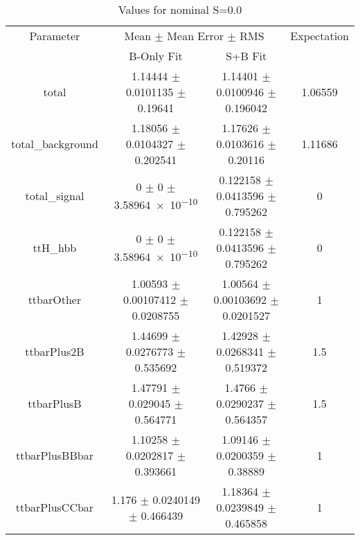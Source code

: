 \begin{table}
\centering
\caption{Values for nominal S=0.0}
\begin{tabular}{cccc}
\toprule
Parameter & \multicolumn{2}{c}{Mean $\pm$ Mean Error $\pm$ RMS} & Expectation\\
 & B-Only Fit & S+B Fit & \\
\midrule
total & \num{1.14444} $\pm$ \num{0.0101135} $\pm$ \num{0.19641} & \num{1.14401} $\pm$ \num{0.0100946} $\pm$ \num{0.196042} & \num{1.06559}\\
total\_background & \num{1.18056} $\pm$ \num{0.0104327} $\pm$ \num{0.202541} & \num{1.17626} $\pm$ \num{0.0103616} $\pm$ \num{0.20116} & \num{1.11686}\\
total\_signal & \num{0} $\pm$ \num{0} $\pm$ \num{3.58964e-10} & \num{0.122158} $\pm$ \num{0.0413596} $\pm$ \num{0.795262} & \num{0}\\
ttH\_hbb & \num{0} $\pm$ \num{0} $\pm$ \num{3.58964e-10} & \num{0.122158} $\pm$ \num{0.0413596} $\pm$ \num{0.795262} & \num{0}\\
ttbarOther & \num{1.00593} $\pm$ \num{0.00107412} $\pm$ \num{0.0208755} & \num{1.00564} $\pm$ \num{0.00103692} $\pm$ \num{0.0201527} & \num{1}\\
ttbarPlus2B & \num{1.44699} $\pm$ \num{0.0276773} $\pm$ \num{0.535692} & \num{1.42928} $\pm$ \num{0.0268341} $\pm$ \num{0.519372} & \num{1.5}\\
ttbarPlusB & \num{1.47791} $\pm$ \num{0.029045} $\pm$ \num{0.564771} & \num{1.4766} $\pm$ \num{0.0290237} $\pm$ \num{0.564357} & \num{1.5}\\
ttbarPlusBBbar & \num{1.10258} $\pm$ \num{0.0202817} $\pm$ \num{0.393661} & \num{1.09146} $\pm$ \num{0.0200359} $\pm$ \num{0.38889} & \num{1}\\
ttbarPlusCCbar & \num{1.176} $\pm$ \num{0.0240149} $\pm$ \num{0.466439} & \num{1.18364} $\pm$ \num{0.0239849} $\pm$ \num{0.465858} & \num{1}\\
\bottomrule
\end{tabular}
\end{table}